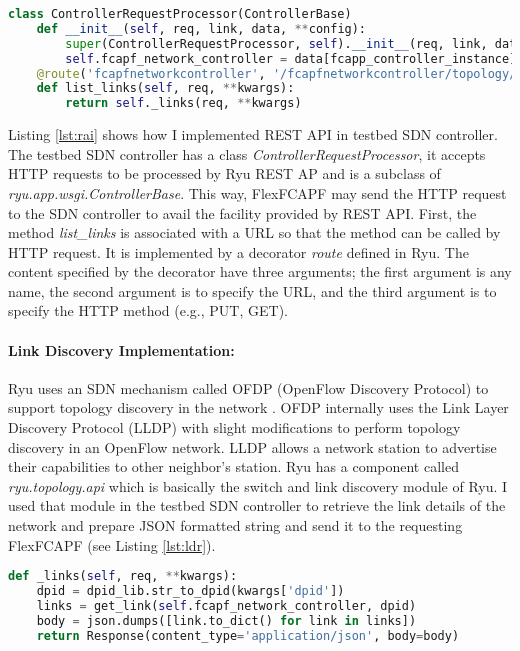 \begin{lstlisting}[caption={REST API implementation},label={lst:rai},language=Python,tabsize=2,basicstyle=\footnotesize,breaklines=true, showspaces=false,showstringspaces=false,showtabs=false,frame=single]
class ControllerRequestProcessor(ControllerBase)
	def __init__(self, req, link, data, **config):
		super(ControllerRequestProcessor, self).__init__(req, link, data, **config)
		self.fcapf_network_controller = data[fcapp_controller_instance]
	@route('fcapfnetworkcontroller', '/fcapfnetworkcontroller/topology/links', methods=['GET'])
	def list_links(self, req, **kwargs):
		return self._links(req, **kwargs)
\end{lstlisting}

Listing \ref{lst:rai} shows how I implemented REST API in testbed SDN controller. The testbed SDN controller has a class \textit{ControllerRequestProcessor}, it accepts HTTP requests to be processed by Ryu REST AP and is a subclass of \textit{ryu.app.wsgi.ControllerBase}. This way, FlexFCAPF may send the HTTP request to the SDN controller to avail the facility provided by REST API. First, the method \textit{list\_links} is associated with a URL so that the method can be called by HTTP request. It is implemented by a decorator \textit{route} defined in Ryu. The content specified by the decorator have three arguments; the first argument is any name, the second argument is to specify the URL, and the third argument is to specify the HTTP method (e.g., PUT, GET).

\paragraph{Link Discovery Implementation:}
Ryu uses an SDN mechanism called OFDP (OpenFlow Discovery Protocol) to support topology discovery in the network \cite{ofdp}. OFDP internally uses the Link Layer Discovery Protocol (LLDP) \cite{5251812} with slight modifications to perform topology discovery in an OpenFlow network. LLDP allows a network station to advertise their capabilities to other neighbor's station. Ryu has a component called \textit{ryu.topology.api} which is basically the switch and link discovery module of Ryu. I used that module in the testbed SDN controller to retrieve the link details of the network and prepare JSON formatted string and send it to the requesting FlexFCAPF (see Listing \ref{lst:ldr}).

\begin{lstlisting}[caption={Link discovry request},label={lst:ldr},language=Python,tabsize=2,basicstyle=\footnotesize,breaklines=true, showspaces=false,showstringspaces=false,showtabs=false,frame=single]
def _links(self, req, **kwargs):
	dpid = dpid_lib.str_to_dpid(kwargs['dpid'])
	links = get_link(self.fcapf_network_controller, dpid)
	body = json.dumps([link.to_dict() for link in links])
	return Response(content_type='application/json', body=body)
\end{lstlisting}

